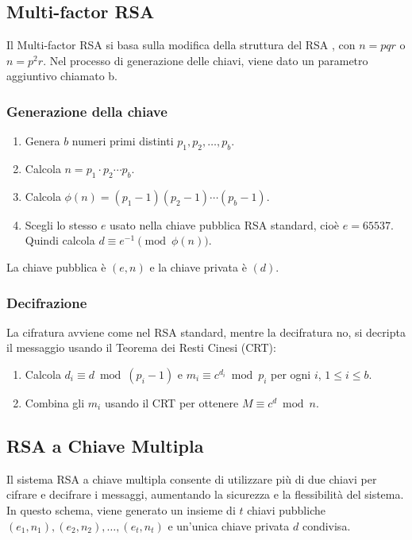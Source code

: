 \documentclass[a4paper,12pt]{report}
\begin{document}
\subsection{Multi-factor RSA} \cite{Nasution_2020}
Il Multi-factor RSA si basa sulla modifica della struttura del RSA , con \(n = pqr\) o \(n = p^2 r\). 
Nel processo di generazione delle chiavi, viene dato un parametro aggiuntivo chiamato b. 

\subsubsection*{Generazione della chiave}
\begin{enumerate}
\item Genera $b$ numeri primi distinti $p_1, p_2, \ldots, p_b$.
\item Calcola $n = p_1 \cdot p_2 \cdots p_b$.
\item Calcola $\phi(n) = (p_1 - 1)(p_2 - 1) \cdots (p_b - 1)$.
\item Scegli lo stesso $e$ usato nella chiave pubblica RSA standard, cioè $e = 65537$. Quindi calcola $d \equiv e^{-1} \pmod{\phi(n)}$.
\end{enumerate}
La chiave pubblica è $(e, n)$ e la chiave privata è $(d)$.

\subsubsection*{Decifrazione}
La cifratura avviene come nel RSA standard, mentre la decifratura no, si decripta il messaggio usando il Teorema dei Resti Cinesi (CRT):
\begin{enumerate}
\item Calcola $d_i \equiv d \bmod (p_i - 1)$ e $m_i \equiv c^{d_i} \bmod p_i$ per ogni $i$, $1 \leq i \leq b$.
\item Combina gli $m_i$ usando il CRT per ottenere $M \equiv c^d \bmod n$.
\end{enumerate}

\subsection{RSA a Chiave Multipla}
Il sistema RSA a chiave multipla consente di utilizzare più di due chiavi per cifrare e decifrare i messaggi, aumentando la sicurezza e la flessibilità del sistema. In questo schema, viene generato un insieme di $t$ chiavi pubbliche $(e_1, n_1), (e_2, n_2), \ldots, (e_t, n_t)$ e un'unica chiave privata $d$ condivisa.
\end{document}
